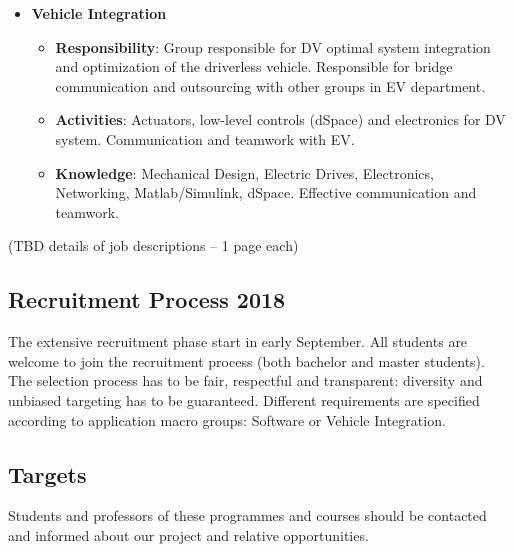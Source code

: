 \documentclass[graybox]{svmult}
\begin{document}
\begin{itemize}
	\item \textbf{Vehicle Integration}
	\begin{itemize}
		\item \textbf{Responsibility}: Group responsible for DV optimal system integration and optimization of the driverless vehicle. Responsible for bridge communication and outsourcing with other groups in EV department.
		\item \textbf{Activities}: Actuators, low-level controls (dSpace) and electronics for DV system. Communication and teamwork with EV.
		\item \textbf{Knowledge}: Mechanical Design, Electric Drives, Electronics, Networking, Matlab/Simulink, dSpace. Effective communication and teamwork.
	\end{itemize}
\end{itemize}

(TBD details of job descriptions – 1 page each)

\subsection{Recruitment Process 2018}

The extensive recruitment phase start in early September.
All students are welcome to join the recruitment process (both bachelor and master students).
The selection process has to be fair, respectful and transparent: diversity and unbiased targeting has to be guaranteed.
Different requirements are specified according to application macro groups: Software or Vehicle Integration.

\subsection{Targets}

Students and professors of these programmes and courses should be contacted and informed about our project and relative opportunities.
\end{document}
